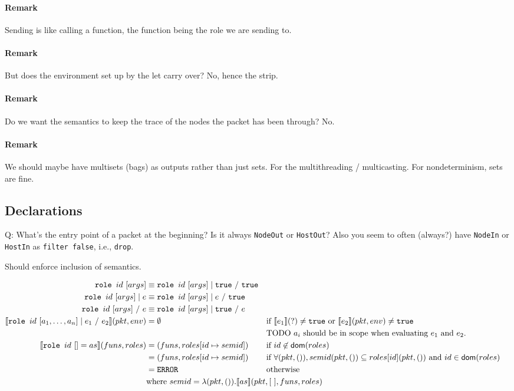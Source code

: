 \documentclass{report}
\newcommand\sem[1]{\llbracket #1\rrbracket}
\newcommand{\pkt}{\ensuremath{pkt}}
\newcommand{\env}{\ensuremath{env}}
\newcommand{\true}{\texttt{true}}
\newcommand{\ERROR}{\texttt{ERROR}}
\begin{document}
\paragraph{Remark} Sending is like calling a function, the function being the role we are sending to.

\paragraph{Remark} But does the environment set up by the let carry over? No, hence the strip.

\paragraph{Remark} Do we want the semantics to keep the trace of the nodes the packet has been through?
No.

\paragraph{Remark} We should maybe have multisets (bags) as outputs rather than just sets.
For the multithreading / multicasting. For nondeterminism, sets are fine.

\subsection{Declarations}

Q: What's the entry point of a packet at the beginning? Is it always \texttt{NodeOut} or
\texttt{HostOut}? Also you seem to often (always?) have \texttt{NodeIn} or \texttt{HostIn}
as \texttt{filter false}, i.e., \texttt{drop}.

Should enforce inclusion of semantics.

\begin{align*}
\texttt{role }id \ [args] & \equiv\texttt{role }id \ [args] \mid\true\ /\ \true\\
\texttt{role }id \ [args] \mid e& \equiv\texttt{role }id \ [args] \mid e\ /\ \true\\
\texttt{role }id \ [args] \ /\ e& \equiv\texttt{role }id \ [args] \mid\true\ /\ e\\
\sem{\texttt{role }id \ [a_1,\ldots,a_n] \mid e_1\ /\ e_2}(\pkt,\env) & = \emptyset &&
\text{if $\sem{e_1}(?)\neq\true$ or $\sem{e_2}(\pkt,\env)\neq\true$}\\
&& &\text{TODO $a_i$ should be in scope when evaluating $e_1$ and $e_2$.}\\
\sem{\texttt{role }id \ [] = as}(funs,roles) & = 
(funs,roles[id\mapsto semid]) &&
\text{if $id\not\in{\sf dom}(roles)$}\\
& = (funs,roles[id\mapsto semid]) &&
\text{if $\forall(pkt,()),semid(\pkt,())\subseteq roles[id](\pkt,())$ and 
$id\in{\sf dom}(roles)$ }\\
& = \ERROR && \text{otherwise}\\
&\rlap{where $semid=\lambda(\pkt,()).\sem{as}(\pkt,[\ ],funs,roles)$}
\end{align*}
\end{document}

